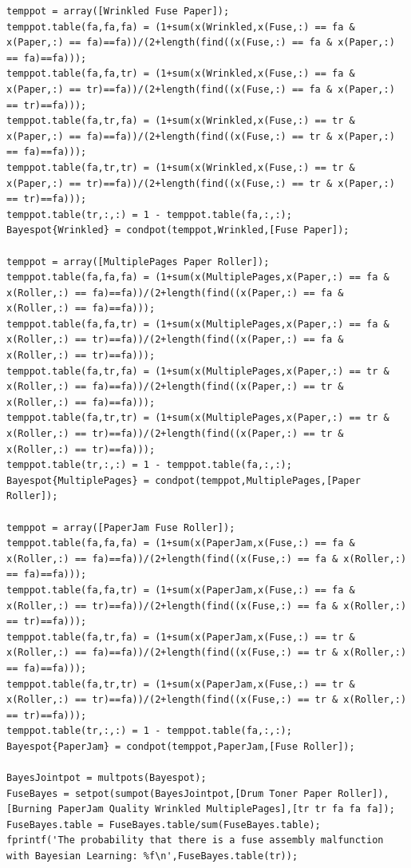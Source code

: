 \documentclass[11pt,a4paper,oneside]{report}
\begin{document}
\begin{lstlisting}
temppot = array([Wrinkled Fuse Paper]);
temppot.table(fa,fa,fa) = (1+sum(x(Wrinkled,x(Fuse,:) == fa & x(Paper,:) == fa)==fa))/(2+length(find((x(Fuse,:) == fa & x(Paper,:) == fa)==fa)));
temppot.table(fa,fa,tr) = (1+sum(x(Wrinkled,x(Fuse,:) == fa & x(Paper,:) == tr)==fa))/(2+length(find((x(Fuse,:) == fa & x(Paper,:) == tr)==fa)));
temppot.table(fa,tr,fa) = (1+sum(x(Wrinkled,x(Fuse,:) == tr & x(Paper,:) == fa)==fa))/(2+length(find((x(Fuse,:) == tr & x(Paper,:) == fa)==fa)));
temppot.table(fa,tr,tr) = (1+sum(x(Wrinkled,x(Fuse,:) == tr & x(Paper,:) == tr)==fa))/(2+length(find((x(Fuse,:) == tr & x(Paper,:) == tr)==fa)));
temppot.table(tr,:,:) = 1 - temppot.table(fa,:,:);
Bayespot{Wrinkled} = condpot(temppot,Wrinkled,[Fuse Paper]);

temppot = array([MultiplePages Paper Roller]);
temppot.table(fa,fa,fa) = (1+sum(x(MultiplePages,x(Paper,:) == fa & x(Roller,:) == fa)==fa))/(2+length(find((x(Paper,:) == fa & x(Roller,:) == fa)==fa)));
temppot.table(fa,fa,tr) = (1+sum(x(MultiplePages,x(Paper,:) == fa & x(Roller,:) == tr)==fa))/(2+length(find((x(Paper,:) == fa & x(Roller,:) == tr)==fa)));
temppot.table(fa,tr,fa) = (1+sum(x(MultiplePages,x(Paper,:) == tr & x(Roller,:) == fa)==fa))/(2+length(find((x(Paper,:) == tr & x(Roller,:) == fa)==fa)));
temppot.table(fa,tr,tr) = (1+sum(x(MultiplePages,x(Paper,:) == tr & x(Roller,:) == tr)==fa))/(2+length(find((x(Paper,:) == tr & x(Roller,:) == tr)==fa)));
temppot.table(tr,:,:) = 1 - temppot.table(fa,:,:);
Bayespot{MultiplePages} = condpot(temppot,MultiplePages,[Paper Roller]);

temppot = array([PaperJam Fuse Roller]);
temppot.table(fa,fa,fa) = (1+sum(x(PaperJam,x(Fuse,:) == fa & x(Roller,:) == fa)==fa))/(2+length(find((x(Fuse,:) == fa & x(Roller,:) == fa)==fa)));
temppot.table(fa,fa,tr) = (1+sum(x(PaperJam,x(Fuse,:) == fa & x(Roller,:) == tr)==fa))/(2+length(find((x(Fuse,:) == fa & x(Roller,:) == tr)==fa)));
temppot.table(fa,tr,fa) = (1+sum(x(PaperJam,x(Fuse,:) == tr & x(Roller,:) == fa)==fa))/(2+length(find((x(Fuse,:) == tr & x(Roller,:) == fa)==fa)));
temppot.table(fa,tr,tr) = (1+sum(x(PaperJam,x(Fuse,:) == tr & x(Roller,:) == tr)==fa))/(2+length(find((x(Fuse,:) == tr & x(Roller,:) == tr)==fa)));
temppot.table(tr,:,:) = 1 - temppot.table(fa,:,:);
Bayespot{PaperJam} = condpot(temppot,PaperJam,[Fuse Roller]);

BayesJointpot = multpots(Bayespot);
FuseBayes = setpot(sumpot(BayesJointpot,[Drum Toner Paper Roller]),[Burning PaperJam Quality Wrinkled MultiplePages],[tr tr fa fa fa]);
FuseBayes.table = FuseBayes.table/sum(FuseBayes.table);
fprintf('The probability that there is a fuse assembly malfunction with Bayesian Learning: %f\n',FuseBayes.table(tr));


\end{lstlisting}
\end{document}
